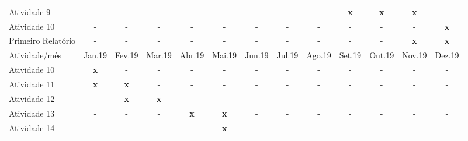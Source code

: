 \documentclass[12pt]{article}
\begin{document}
\begin{table}[!ht]
\begin{center}
{\begin{tabular}{l ccc ccc ccc ccc}
    \small Atividade 9
    & \small - & \small - & \small - & \small -  
    & \small - & \small - & \small - & \small -
    & \small {\bf x} & \small {\bf x} & \small {\bf x} & \small - \\ 
    
    
    \small Atividade 10
    & \small - & \small - & \small - & \small -  
    & \small - & \small - & \small - & \small -
    & \small - & \small - & \small - & \small {\bf x} \\ 
    
    \small Primeiro Relatório
    & \small - & \small - & \small - & \small -  
    & \small - & \small - & \small - & \small -
    & \small - & \small - & \small {\bf x} & \small {\bf x} \\ 



    \bottomrule
    \toprule
    \small Atividade/mês & \small Jan.19 & \small Fev.19 & \small Mar.19
                         & \small Abr.19 & \small Mai.19 & \small Jun.19
                         & \small Jul.19 & \small Ago.19 & \small Set.19
                         & \small Out.19 & \small Nov.19 & \small Dez.19

    \\ \hline
    
    \small Atividade 10
    & \small {\bf x} & \small - & \small - & \small -  
    & \small - & \small - & \small - & \small -
    & \small - & \small - & \small - & \small - \\ 


    \small Atividade 11 
    & \small {\bf x} & \small {\bf x} & \small - & \small -  
    & \small - & \small - & \small - & \small -
    & \small - & \small - & \small - & \small - \\ 
    
    
    \small Atividade 12
    & \small - & \small {\bf x} & \small {\bf x} & -
    & \small - & \small - & \small - & \small -
    & \small - & \small - & \small - & \small - \\ 

    \small Atividade 13
    & \small - & \small - & \small - & \small {\bf x}
    & \small {\bf x} & \small - & \small - & \small -
    & \small - & \small - & \small - & \small - \\ 

    \small Atividade 14
    & \small - & \small - & \small - & \small -  
    & \small {\bf x} & \small - & \small - & \small -
    & \small - & \small - & \small - & \small - \\ 



\end{tabular}}
\end{center}
\end{table}
\end{document}
